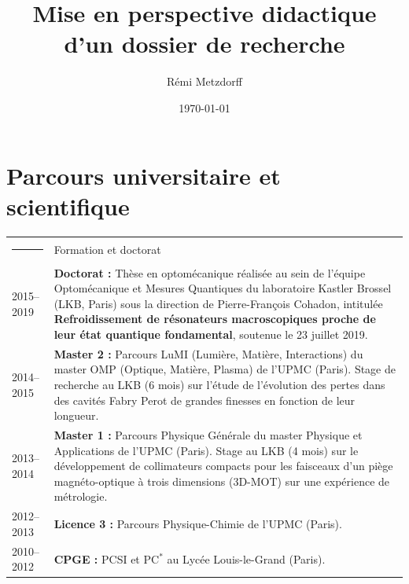 \documentclass[12pt,a4paper]{article}
\title{Mise en perspective didactique d'un dossier de recherche}
\author{Rémi Metzdorff}
\date{\today}
\begin{document}
\maketitle


\section{Parcours universitaire et scientifique}

\noindent
\begin{tabular*}{\textwidth}{p{}<{\raggedleft}p{}}
\textcolor{theme}{\rule{0.12\textwidth}{2.5mm}} &
\large\textcolor{theme}{Formation et doctorat} \vspace{3pt} \\
2015--2019 &
\textbf{Doctorat :} Thèse en optomécanique réalisée au sein de l'équipe Optomécanique et Mesures Quantiques du laboratoire Kastler Brossel (LKB, Paris) sous la direction de Pierre-François Cohadon, intitulée \textbf{Refroidissement de résonateurs macroscopiques proche de leur état quantique fondamental}, soutenue le 23 juillet 2019. \vspace{3pt} \\
2014--2015 &
\textbf{Master 2 :} Parcours LuMI (Lumière, Matière, Interactions) du master OMP (Optique, Matière, Plasma) de l'UPMC (Paris).
Stage de recherche au LKB (6 mois) sur l'étude de l'évolution des pertes dans des cavités Fabry Perot de grandes finesses en fonction de leur longueur. \vspace{3pt} \\
2013--2014 &
\textbf{Master 1 :} Parcours Physique Générale du master Physique et Applications de l'UPMC (Paris).
Stage au LKB (4 mois) sur le développement de collimateurs compacts pour les faisceaux d'un piège magnéto-optique à trois dimensions (3D-MOT) sur une expérience de métrologie. \vspace{3pt} \\
2012--2013 &
\textbf{Licence 3 :} Parcours Physique-Chimie de l'UPMC (Paris). \vspace{3pt} \\
2010--2012 &
\textbf{CPGE :} PCSI et PC$^*$ au Lycée Louis-le-Grand (Paris). \vspace{10pt} \\


\end{tabular*}
\end{document}
